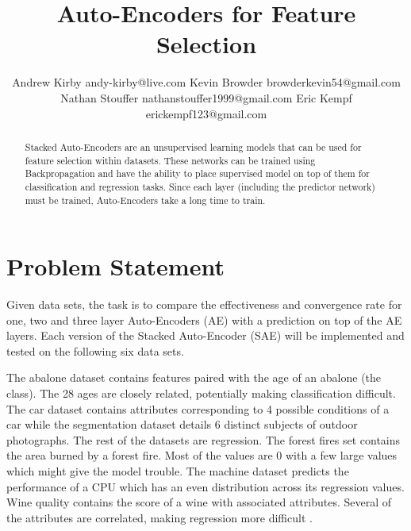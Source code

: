 \documentclass[twoside,11pt]{article}
\begin{document}
\title{Auto-Encoders for Feature Selection}

\author{\name Andrew Kirby \email andy-kirby@live.com \AND
		\name Kevin Browder \email browderkevin54@gmail.com \AND
		\name Nathan Stouffer \email nathanstouffer1999@gmail.com \AND
		\name Eric Kempf \email erickempf123@gmail.com }

\maketitle

\begin{abstract}
Stacked Auto-Encoders are an unsupervised learning models that can be used for feature selection within datasets. These networks can be trained using Backpropagation and have the ability to place supervised model on top of them for classification and regression tasks. Since each layer (including the predictor network) must be trained, Auto-Encoders take a long time to train.
\end{abstract}

\section{Problem Statement}
	Given data sets, the task is to compare the effectiveness and convergence rate for one, two and three layer Auto-Encoders (AE) with a prediction on top of the AE layers. Each version of the Stacked Auto-Encoder (SAE) will be implemented and tested on the following six data sets.
		
	The abalone dataset contains features paired with the age of an abalone (the class). The 28 ages are closely related, potentially making classification difficult.
	The car dataset contains attributes corresponding to 4 possible conditions of a car while the segmentation dataset details 6 distinct subjects of outdoor photographs.
	The rest of the datasets are regression.
	The forest fires set contains the area burned by a forest fire. Most of the values are 0 with a few large values which might give the model trouble.
	The machine dataset predicts the performance of a CPU which has an even distribution across its regression values. Wine quality contains the score of a wine with associated attributes. Several of the attributes are correlated, making regression more difficult \citep{datasets}.
	
\end{document}
